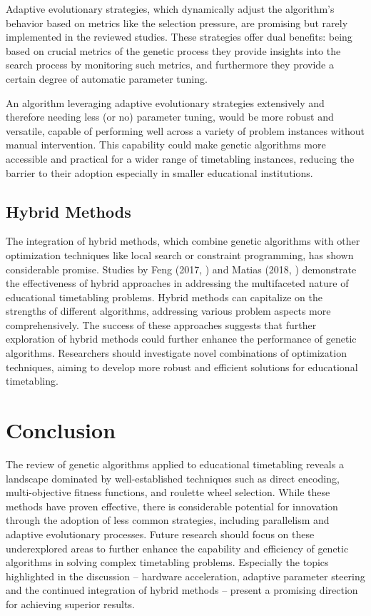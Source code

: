 \documentclass[sigconf]{acmart}
\begin{document}
Adaptive evolutionary strategies, which dynamically adjust the algorithm's
behavior based on metrics like the selection pressure, are promising but rarely
implemented in the reviewed studies.
These strategies offer dual benefits: being based on crucial metrics of the
genetic process they provide insights into the search process by monitoring
such metrics,
and furthermore they provide a certain degree of automatic parameter tuning.

An algorithm leveraging adaptive evolutionary strategies extensively and
therefore needing less (or no) parameter tuning, would be more robust and
versatile, capable of performing well across a variety of problem
instances without manual intervention. This capability could make genetic
algorithms more accessible and practical for a wider range of timetabling
instances, reducing the barrier to their adoption especially in smaller
educational institutions.

\subsection{Hybrid Methods}
The integration of hybrid methods, which combine genetic algorithms with other
optimization techniques like local search or constraint programming,
has shown considerable promise.
Studies by Feng (2017, \cite{Feng2017}) and Matias (2018, \cite{Matias2018fair})
demonstrate the effectiveness of hybrid approaches in addressing the
multifaceted nature of educational timetabling problems. Hybrid methods can
capitalize on the strengths of different algorithms, addressing various problem
aspects more comprehensively.
The success of these approaches suggests that further exploration of hybrid
methods could further enhance the performance of genetic algorithms.
Researchers should investigate novel combinations of optimization techniques,
aiming to develop more robust and efficient solutions for educational
timetabling.


\section{Conclusion}
The review of genetic algorithms applied to educational timetabling reveals a
landscape dominated by well-established techniques such as direct encoding,
multi-objective fitness functions, and roulette wheel selection. While these
methods have proven effective, there is considerable potential for innovation
through the adoption of less common strategies, including parallelism and 
adaptive evolutionary processes.
Future research should focus on these underexplored areas to further enhance
the capability and efficiency of genetic algorithms in solving complex
timetabling problems.
Especially the topics highlighted in the discussion -- hardware acceleration,
adaptive parameter steering and the continued integration of hybrid methods --
present a promising direction for achieving superior results.
\end{document}
